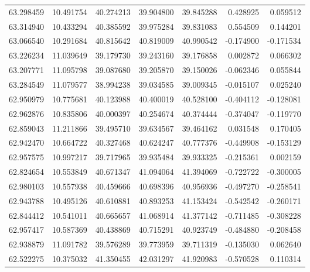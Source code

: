 \begin{tabular}{rrrrrrr}
 63.298459 &  10.491754 &         40.274213 &         39.904800 &         39.845288 &  0.428925 &  0.059512 \\
 63.314940 &  10.433294 &         40.385592 &         39.975284 &         39.831083 &  0.554509 &  0.144201 \\
 63.066540 &  10.291684 &         40.815642 &         40.819009 &         40.990542 & -0.174900 & -0.171534 \\
 63.226234 &  11.039649 &         39.179730 &         39.243160 &         39.176858 &  0.002872 &  0.066302 \\
 63.207771 &  11.095798 &         39.087680 &         39.205870 &         39.150026 & -0.062346 &  0.055844 \\
 63.284549 &  11.079577 &         38.994238 &         39.034585 &         39.009345 & -0.015107 &  0.025240 \\
 62.950979 &  10.775681 &         40.123988 &         40.400019 &         40.528100 & -0.404112 & -0.128081 \\
 62.962876 &  10.835806 &         40.000397 &         40.254674 &         40.374444 & -0.374047 & -0.119770 \\
 62.859043 &  11.211866 &         39.495710 &         39.634567 &         39.464162 &  0.031548 &  0.170405 \\
 62.942470 &  10.664722 &         40.327468 &         40.624247 &         40.777376 & -0.449908 & -0.153129 \\
 62.957575 &  10.997217 &         39.717965 &         39.935484 &         39.933325 & -0.215361 &  0.002159 \\
 62.824654 &  10.553849 &         40.671347 &         41.094064 &         41.394069 & -0.722722 & -0.300005 \\
 62.980103 &  10.557938 &         40.459666 &         40.698396 &         40.956936 & -0.497270 & -0.258541 \\
 62.943788 &  10.495126 &         40.610881 &         40.893253 &         41.153424 & -0.542542 & -0.260171 \\
 62.844412 &  10.541011 &         40.665657 &         41.068914 &         41.377142 & -0.711485 & -0.308228 \\
 62.957417 &  10.587369 &         40.438869 &         40.715291 &         40.923749 & -0.484880 & -0.208458 \\
 62.938879 &  11.091782 &         39.576289 &         39.773959 &         39.711319 & -0.135030 &  0.062640 \\
 62.522275 &  10.375032 &         41.350455 &         42.031297 &         41.920983 & -0.570528 &  0.110314 \\

\end{tabular}
